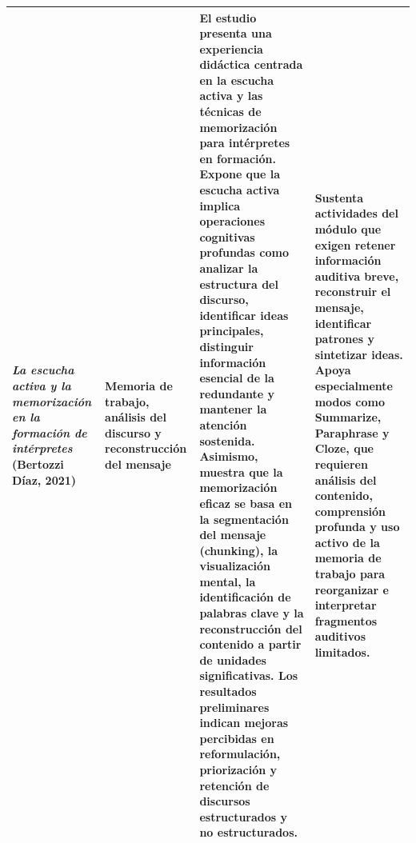 \begin{center}
\begin{longtable}{| m{4.2cm} | m{3cm} | m{4.5cm} | m{4.5cm} |}
\textit{La escucha activa y la memorización en la formación de intérpretes} (Bertozzi Díaz, 2021) \cite{bertozzi_2021_escucha_activa_interpretes} &
Memoria de trabajo, análisis del discurso y reconstrucción del mensaje &
El estudio presenta una experiencia didáctica centrada en la escucha activa y las técnicas de memorización para intérpretes en formación. Expone que la escucha activa implica operaciones cognitivas profundas como analizar la estructura del discurso, identificar ideas principales, distinguir información esencial de la redundante y mantener la atención sostenida. Asimismo, muestra que la memorización eficaz se basa en la segmentación del mensaje (chunking), la visualización mental, la identificación de palabras clave y la reconstrucción del contenido a partir de unidades significativas. Los resultados preliminares indican mejoras percibidas en reformulación, priorización y retención de discursos estructurados y no estructurados. &
Sustenta actividades del módulo que exigen retener información auditiva breve, reconstruir el mensaje, identificar patrones y sintetizar ideas. Apoya especialmente modos como Summarize, Paraphrase y Cloze, que requieren análisis del contenido, comprensión profunda y uso activo de la memoria de trabajo para reorganizar e interpretar fragmentos auditivos limitados. \\ \hline

\end{longtable}
\end{center}

